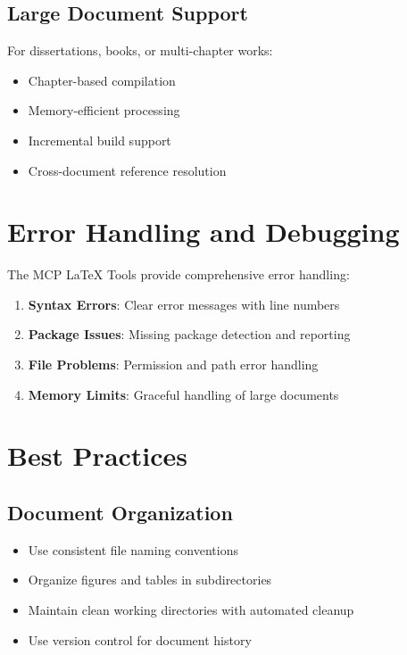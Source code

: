 \documentclass[12pt]{article}
\begin{document}
\subsection{Large Document Support}

For dissertations, books, or multi-chapter works:

\begin{itemize}
    \item Chapter-based compilation
    \item Memory-efficient processing
    \item Incremental build support
    \item Cross-document reference resolution
\end{itemize}

\section{Error Handling and Debugging}

The MCP LaTeX Tools provide comprehensive error handling:

\begin{enumerate}
    \item \textbf{Syntax Errors}: Clear error messages with line numbers
    \item \textbf{Package Issues}: Missing package detection and reporting
    \item \textbf{File Problems}: Permission and path error handling
    \item \textbf{Memory Limits}: Graceful handling of large documents
\end{enumerate}

\section{Best Practices}

\subsection{Document Organization}

\begin{itemize}
    \item Use consistent file naming conventions
    \item Organize figures and tables in subdirectories
    \item Maintain clean working directories with automated cleanup
    \item Use version control for document history
\end{itemize}
\end{document}
